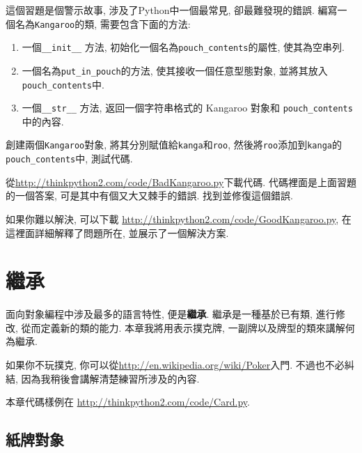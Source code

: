\documentclass[10pt]{book}
\begin{document}
\begin{exercise}
\label{kangaroo}

這個習題是個警示故事, 涉及了Python中一個最常見, 卻最難發現的錯誤. 
編寫一個名為{\tt Kangaroo}的類, 需要包含下面的方法:

\begin{enumerate}

\item 一個\verb"__init__" 方法, 初始化一個名為\verb"pouch_contents"的屬性, 
使其為空串列. 

\item 一個名為\verb"put_in_pouch"的方法, 使其接收一個任意型態對象, 並將其放入
\verb"pouch_contents"中. 

\item 一個\verb"__str__" 方法, 返回一個字符串格式的 Kangaroo 對象和 \verb"pouch_contents" 中的內容. 

\end{enumerate}
%
創建兩個{\tt Kangaroo}對象, 將其分別賦值給{\tt kanga}和{\tt roo}, 
然後將{\tt roo}添加到{\tt kanga}的\verb"pouch_contents"中, 測試代碼. 

從\url{http://thinkpython2.com/code/BadKangaroo.py}下載代碼. 
代碼裡面是上面習題的一個答案, 
可是其中有個又大又棘手的錯誤. 找到並修復這個錯誤. 

如果你難以解決, 可以下載
\url{http://thinkpython2.com/code/GoodKangaroo.py}, 
在這裡面詳細解釋了問題所在, 並展示了一個解決方案. 

\end{exercise}


\chapter{繼承}

面向對象編程中涉及最多的語言特性, 便是{\bf 繼承}. 
繼承是一種基於已有類, 進行修改, 從而定義新的類的能力. 
本章我將用表示撲克牌, 一副牌以及牌型的類來講解何為繼承. 

如果你不玩撲克, 你可以從\url{http://en.wikipedia.org/wiki/Poker}入門. 
不過也不必糾結, 因為我稍後會講解清楚練習所涉及的內容. 

本章代碼樣例在
\url{http://thinkpython2.com/code/Card.py}.


\section{紙牌對象}
\end{document}
